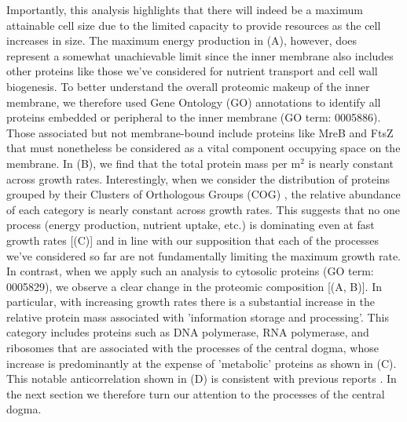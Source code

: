 Importantly, this analysis highlights that there will indeed be a maximum
attainable cell size due to the limited capacity to provide resources as the
cell increases in size. The maximum energy production in
(A), however, does represent a somewhat unachievable limit
since the inner membrane also includes other proteins like those we've
considered for nutrient transport and cell wall biogenesis. To better understand
the overall proteomic makeup of the inner membrane, we therefore used Gene
Ontology (GO) annotations \citep{ashburner2000, thegeneOntologyconsortium2018}
to identify all proteins embedded or peripheral to the inner membrane (GO term:
0005886). Those associated but not membrane-bound include proteins like MreB and
FtsZ that must nonetheless be considered as a vital component occupying space on
the membrane. In (B), we find that the total protein mass
per \textmu m$^2$ is nearly constant across growth rates. Interestingly, when we
consider the distribution of proteins grouped by their Clusters of Orthologous
Groups (COG) \citep{tatusov2000}, the relative abundance of each category is
nearly constant across growth rates. This suggests that no one process (energy
production, nutrient uptake, etc.) is dominating even at fast growth rates
[(C)] and in line with our supposition that each of the
processes we've considered so far are not fundamentally limiting the maximum
growth rate. In contrast, when we apply such an analysis to cytosolic proteins
(GO term: 0005829), we observe a clear change in the proteomic composition
[(A, B)]. In particular, with increasing growth rates there is
a substantial increase in the relative protein mass associated with 'information
storage and processing'. This category includes proteins such as DNA polymerase,
RNA polymerase, and ribosomes that are associated with the processes of the
central dogma, whose increase is predominantly at the expense of 'metabolic'
proteins as shown in (C).
This notable anticorrelation shown in
(D) is consistent with  previous reports \citep{scott2010, hui2015, zhu2019}. In the next section we therefore turn our attention to the
processes of the central dogma.

